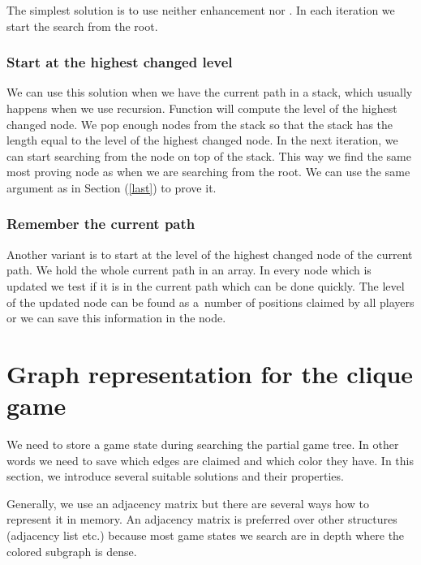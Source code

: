 The simplest solution is to use neither enhancement 
nor . In each iteration we start the search from the root.

\subsubsection{Start at the highest changed level}

We can use this solution when we have the current path in a stack, which usually
happens when we use recursion. Function  will compute the level of
the highest changed node. We pop enough nodes from the stack so that the stack has
the length equal to the level of the highest changed node. In the next iteration, we can
start searching from the node on top of the stack. This way
we find the same most proving node as when we are searching from the root. We can
use the same argument as in Section  (\ref{last}) to prove it.

\subsubsection{Remember the current path}

Another variant is to start at the level of the highest changed node of the current path.
We hold the whole current path in an array. In every
node which is updated we test if it is in the current path which can be done
quickly. The level of the updated node can be found as a~number of positions
claimed by all players or we can save this information in the node.


\section{Graph representation for the clique game} 

We need to store a game state during searching the partial game tree. In other words we
need to save which edges are claimed and which color they have. In
this section, we introduce several suitable solutions and their properties.

Generally, we use an adjacency matrix but there are several ways how to
represent it in memory. An adjacency matrix is preferred over other structures
(adjacency list etc.) because most game states we search are in depth where the
colored subgraph is dense.

